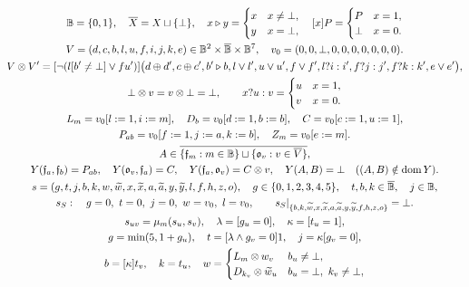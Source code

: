 \begin{gather}
\mathbb B=\{0,1\},\quad \overline X=X\sqcup\{\bot\},\quad
x\triangleright y=\begin{cases}x&x\ne\bot,\\y&x=\bot,\end{cases}\quad
[x]P=\begin{cases}P&x=1,\\\bot&x=0.\end{cases}\\
V=(d,c,b,l,u,f,i,j,k,e)\in \mathbb B^2\times\overline{\mathbb B}\times\mathbb B^7,\quad
v_0=(0,0,\bot,0,0,0,0,0,0,0).\\
V\otimes V'=
[\neg(l[b'\ne\bot]\lor f u')]\bigl(d\oplus d',c\oplus c',b'\triangleright b,
 l\lor l',u\lor u',f\lor f', l?i:i',f?j:j',f?k:k',e\lor e'\bigr),\\
\bot\otimes v=v\otimes\bot=\bot,\qquad x?u:v=\begin{cases}u&x=1,\\v&x=0.\end{cases}\\
L_m=v_0[l:=1,i:=m],\quad D_b=v_0[d:=1,b:=b],\quad
C=v_0[c:=1,u:=1],\\ P_{ab}=v_0[f:=1,j:=a,k:=b],\quad Z_m=v_0[e:=m].\\
A\in\overline{\{\mathfrak f_m:m\in\mathbb B\}\sqcup\{\mathfrak o_v:v\in\overline V\}},\\
Y(\mathfrak f_a,\mathfrak f_b)=P_{ab},\quad
Y(\mathfrak o_v,\mathfrak f_a)=C,\quad
Y(\mathfrak f_a,\mathfrak o_v)=C\otimes v,\quad
Y(A,B)=\bot\quad ((A,B)\notin{\rm dom}\,Y).\\
s=(g,t,j,b,k,w,\widetilde w,x,\widetilde x,a,\widetilde a,y,\widetilde y,l,f,h,z,o),\quad
g\in\{0,1,2,3,4,5\},\quad t,b,k\in\overline{\mathbb B},\quad j\in\mathbb B,\\
s_S:\quad g=0,\ t=0,\ j=0,\ w=v_0,\ l=v_0,\qquad
s_S|_{\{b,k,\widetilde w,x,\widetilde x,a,\widetilde a,y,\widetilde y,f,h,z,o\}}=\bot.\\
\begin{gathered}
s_{uv}=\mu_m(s_u,s_v),\quad \lambda=[g_u=0],\quad\kappa=[t_u=1],\\
g=\min(5,1+g_u),\quad t=[\lambda\land g_v=0]1,\quad j=\kappa[g_v=0],
\end{gathered}\\
 b=[\kappa]t_v,\quad k=t_u,\quad
 w=\begin{cases}L_m\otimes w_v&b_u\ne\bot,\\D_{k_v}\otimes\widetilde w_u&b_u=\bot,\ k_v\ne\bot,\\

\end{cases}
\end{gather}
